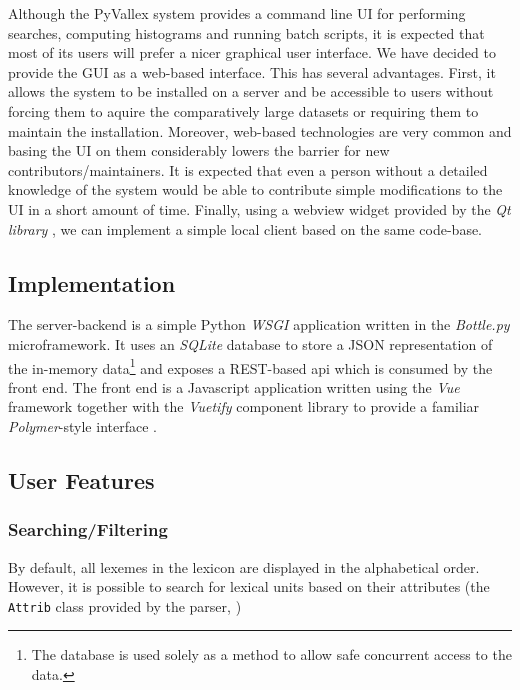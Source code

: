 \documentclass[10pt, a4paper]{article}
\newcommand{\secref}[1]{\StrSubstitute{\getrefnumber{#1}}{.}{ }}
\begin{document}
Although the PyVallex system provides a command line UI for performing searches, computing histograms
and running batch scripts, it is expected that most of its users will prefer a nicer graphical user interface.
We have decided to provide the GUI as a web-based interface. This has several advantages. First, it allows
the system to be installed on a server and be accessible to users without forcing them to aquire the comparatively large datasets or requiring them to maintain the installation. Moreover, web-based technologies are very
common and basing the UI on them considerably lowers the barrier for new contributors/maintainers. It
is expected that even a person without a detailed knowledge of the system would be able to contribute simple modifications to the UI in a short amount of time. Finally, using a webview widget provided by the
\emph{Qt library} \cite{tool:Qt},
we can implement a simple local client based on the same code-base.

\subsection{Implementation}
The server-backend is a simple Python \emph{WSGI} \cite{tool:WSGI} application written in the \emph{Bottle.py} \cite{tool:bottle.py}
microframework. It uses an \emph{SQLite} database \cite{tool:SQLite} to store a JSON representation of the in-memory
data\footnote{The database is used solely as a method to allow safe concurrent access to the data.} and exposes a REST-based api which is consumed by the front end. The front end is a Javascript application written using the
\emph{Vue} framework \cite{tool:Vue.js}  together with the 
\emph{Vuetify} component library \cite{tool:Vuetify} to provide a familiar
\emph{Polymer}-style interface \cite{tool:polymer}.

\subsection{User Features}
\subsubsection{Searching/Filtering}
By default, all lexemes in the lexicon are displayed in the alphabetical order.
However, it is possible to search for lexical units based on their attributes 
(the \texttt{Attrib} class provided by the parser, \secref{parser})
\end{document}
